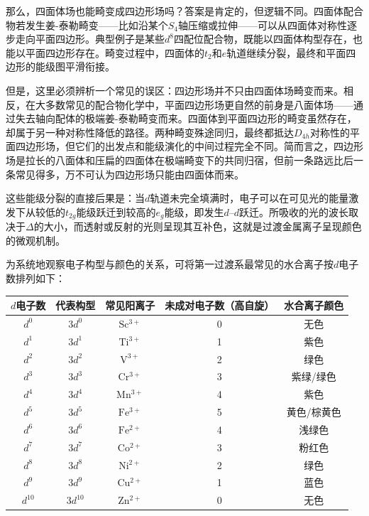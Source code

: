 \documentclass[UTF8]{ctexbook}
\begin{document}
那么，四面体场也能畸变成四边形场吗？答案是肯定的，但逻辑不同。四面体配合物若发生姜-泰勒畸变——比如沿某个$S_4$轴压缩或拉伸——可以从四面体对称性逐步走向平面四边形。典型例子是某些$d^8$四配位配合物，既能以四面体构型存在，也能以平面四边形存在。畸变过程中，四面体的$t_2$和$e$轨道继续分裂，最终和平面四边形的能级图平滑衔接。

但是，这里必须辨析一个常见的误区：四边形场并不只由四面体场畸变而来。相反，在大多数常见的配合物化学中，平面四边形场更自然的前身是八面体场——通过失去轴向配体的极端姜-泰勒畸变而来。四面体到平面四边形的畸变虽然存在，却属于另一种对称性降低的路径。两种畸变殊途同归，最终都抵达$D_{4h}$对称性的平面四边形场，但它们的出发点和能级演化的中间过程完全不同。简而言之，四边形场是拉长的八面体和压扁的四面体在极端畸变下的共同归宿，但前一条路远比后一条常见得多，万不可认为四边形场只能由四面体而来。



这些能级分裂的直接后果是：当$d$轨道未完全填满时，电子可以在可见光的能量激发下从较低的$t_{2g}$能级跃迁到较高的$e_g$能级，即发生$d$--$d$跃迁。所吸收的光的波长取决于$\Delta$的大小，而透射或反射的光则呈现其互补色，这就是过渡金属离子呈现颜色的微观机制。

为系统地观察电子构型与颜色的关系，可将第一过渡系最常见的水合离子按$d$电子数排列如下：

\medskip
\renewcommand{\arraystretch}{1.15}
\noindent\begin{tabular*}{\textwidth}{@{\extracolsep{\fill}}ccccc@{}}
\toprule
$d$电子数 & 代表构型 & 常见阳离子 & 未成对电子数（高自旋） & 水合离子颜色 \\
\midrule
$d^0$ & $3d^0$ & $\mathrm{Sc^{3+}}$ & 0 & 无色 \\
$d^1$ & $3d^1$ & $\mathrm{Ti^{3+}}$ & 1 & 紫色 \\
$d^2$ & $3d^2$ & $\mathrm{V^{3+}}$ & 2 & 绿色 \\
$d^3$ & $3d^3$ & $\mathrm{Cr^{3+}}$ & 3 & 紫绿/绿色 \\
$d^4$ & $3d^4$ & $\mathrm{Mn^{3+}}$ & 4 & 紫色 \\
$d^5$ & $3d^5$ & $\mathrm{Fe^{3+}}$ & 5 & 黄色/棕黄色 \\
$d^6$ & $3d^6$ & $\mathrm{Fe^{2+}}$ & 4 & 浅绿色 \\
$d^7$ & $3d^7$ & $\mathrm{Co^{2+}}$ & 3 & 粉红色 \\
$d^8$ & $3d^8$ & $\mathrm{Ni^{2+}}$ & 2 & 绿色 \\
$d^9$ & $3d^9$ & $\mathrm{Cu^{2+}}$ & 1 & 蓝色 \\
$d^{10}$ & $3d^{10}$ & $\mathrm{Zn^{2+}}$ & 0 & 无色 \\
\bottomrule
\end{tabular*}
\renewcommand{\arraystretch}{1.0}
\end{document}
